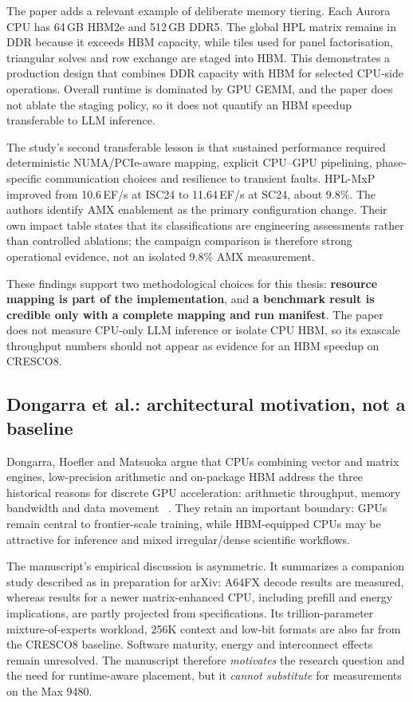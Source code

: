 The paper adds a relevant example of deliberate memory tiering.  Each
Aurora CPU has 64\,GB HBM2e and 512\,GB DDR5.  The global HPL matrix
remains in DDR because it exceeds HBM capacity, while tiles used for
panel factorisation, triangular solves and row exchange are staged into
HBM.  This demonstrates a production design that combines DDR capacity
with HBM for selected CPU-side operations.  Overall runtime is dominated
by GPU GEMM, and the paper does not ablate the staging policy, so it
does not quantify an HBM speedup transferable to LLM inference.

The study's second transferable lesson is that sustained performance
required
deterministic NUMA/PCIe-aware mapping, explicit CPU--GPU pipelining,
phase-specific communication choices and resilience to transient faults.
HPL-MxP improved from 10.6\,EF/s at ISC24 to 11.64\,EF/s at SC24,
about 9.8\%.  The authors identify AMX enablement as the primary
configuration change.  Their own impact table states that its
classifications are engineering assessments rather than controlled
ablations; the campaign comparison is therefore strong operational
evidence, not an isolated 9.8\% AMX measurement.

These findings support two methodological choices for this thesis:
\textbf{resource mapping is part of the implementation}, and
\textbf{a benchmark result is credible only with a complete mapping and
run manifest}.  The paper
does not measure CPU-only LLM inference or isolate CPU HBM, so its
exascale throughput numbers should not appear as evidence for an HBM
speedup on CRESCO8.

\subsection{Dongarra et al.: architectural motivation, not a baseline}

Dongarra, Hoefler and Matsuoka argue that CPUs combining vector and
matrix engines, low-precision arithmetic and on-package HBM address the
three historical reasons for discrete GPU acceleration: arithmetic
throughput, memory bandwidth and data movement
~\cite{dongarra2026gpus}.  They retain an important boundary: GPUs
remain central to frontier-scale training, while HBM-equipped CPUs may
be attractive for inference and mixed irregular/dense scientific
workflows.

The manuscript's empirical discussion is asymmetric.  It summarizes a
companion study described as in preparation for arXiv: A64FX decode
results are measured, whereas results for a newer matrix-enhanced CPU,
including prefill and energy implications, are partly projected from
specifications.  Its trillion-parameter mixture-of-experts workload,
256K context and low-bit formats are also far from the CRESCO8 baseline.
Software maturity, energy and interconnect effects remain unresolved.
The manuscript therefore \emph{motivates} the research question and the
need for runtime-aware placement, but it \emph{cannot substitute} for
measurements on the Max 9480.

